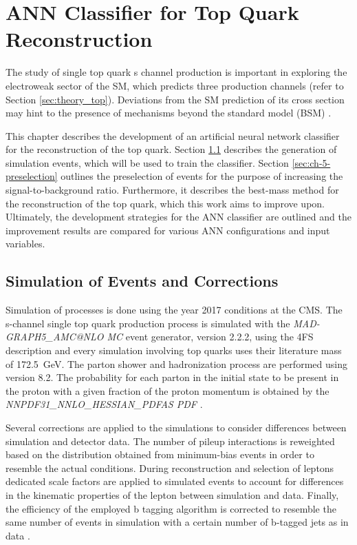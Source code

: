 \chapter{ANN Classifier for Top Quark Reconstruction}
\label{ch:classifier}
The study of single top quark s channel production is important in exploring the electroweak sector of the SM, which predicts three production channels (refer to Section \ref{sec:theory_top}). Deviations from the SM prediction of its cross section may hint to the presence of mechanisms beyond the standard model (BSM) \cite{CMS16}.

This chapter describes the development of an artificial neural network classifier for the reconstruction of the top quark.
Section \ref{sec:ch-5-simulation} describes the generation of simulation events, which will be used to train the classifier. Section \ref{sec:ch-5-preselection} outlines the preselection of events for the purpose of increasing the signal-to-background ratio.
Furthermore, it describes the best-mass method for the reconstruction of the top quark, which this work aims to improve upon. Ultimately, the development strategies for the ANN classifier are outlined and the improvement results are compared for various ANN configurations and input variables.

\section{Simulation of Events and Corrections}
\label{sec:ch-5-simulation}
Simulation of processes is done using the year 2017 conditions at the CMS. The s-channel single top quark production process is simulated with the \emph{MAD-GRAPH5\_AMC@NLO MC} event generator, version 2.2.2, using the 4FS description \cite{Fal18} and every simulation involving top quarks uses their literature mass of \SI{172.5}{GeV}. The parton shower and hadronization process are performed using \pythia version 8.2. The probability for each parton in the initial state to be present in the proton with a given fraction of the proton momentum is obtained by the \emph{NNPDF31\_NNLO\_HESSIAN\_PDFAS PDF} \cite{Fal18}.

Several corrections are applied to the simulations to consider differences between simulation and detector data. The number of pileup interactions is reweighted based on the distribution obtained from minimum-bias events in order to resemble the actual conditions. During reconstruction and selection of leptons dedicated scale factors are applied to simulated events to account for differences in the kinematic properties of the lepton between simulation and data. Finally, the efficiency of the employed b tagging algorithm is corrected to resemble the same number of events in simulation with a certain number of b-tagged jets as in data \cite{Fal18}.

